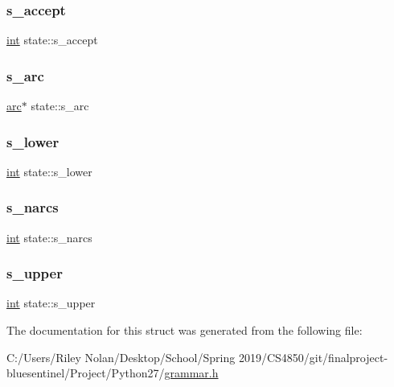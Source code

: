 \mbox{\label{structstate_a11c378b4839835db24f1b9be3785e6fb}} 
\subsubsection{\texorpdfstring{s\_accept}{s\_accept}}
{\footnotesize\ttfamily \mbox{\hyperlink{warnings_8h_a74f207b5aa4ba51c3a2ad59b219a423b}{int}} state\+::s\+\_\+accept}

\mbox{\label{structstate_a48dd0737c713d022f0a325bcf00720ac}} 
\subsubsection{\texorpdfstring{s\_arc}{s\_arc}}
{\footnotesize\ttfamily \mbox{\hyperlink{structarc}{arc}}$\ast$ state\+::s\+\_\+arc}

\mbox{\label{structstate_ac0e13c561d230dd73c96ae092fc8327d}} 
\subsubsection{\texorpdfstring{s\_lower}{s\_lower}}
{\footnotesize\ttfamily \mbox{\hyperlink{warnings_8h_a74f207b5aa4ba51c3a2ad59b219a423b}{int}} state\+::s\+\_\+lower}

\mbox{\label{structstate_ab40e0d7dcf6279c8d580b10c43c52bea}} 
\subsubsection{\texorpdfstring{s\_narcs}{s\_narcs}}
{\footnotesize\ttfamily \mbox{\hyperlink{warnings_8h_a74f207b5aa4ba51c3a2ad59b219a423b}{int}} state\+::s\+\_\+narcs}

\mbox{\label{structstate_a2adaa9bfb5e4b5a4d6e5cf18eb45b35a}} 
\subsubsection{\texorpdfstring{s\_upper}{s\_upper}}
{\footnotesize\ttfamily \mbox{\hyperlink{warnings_8h_a74f207b5aa4ba51c3a2ad59b219a423b}{int}} state\+::s\+\_\+upper}



The documentation for this struct was generated from the following file\+:\begin{DoxyCompactItemize}
\item 
C\+:/\+Users/\+Riley Nolan/\+Desktop/\+School/\+Spring 2019/\+C\+S4850/git/finalproject-\/bluesentinel/\+Project/\+Python27/\mbox{\hyperlink{grammar_8h}{grammar.\+h}}\end{DoxyCompactItemize}
